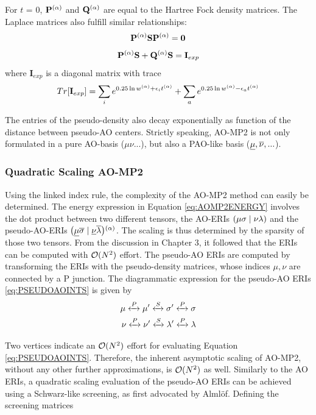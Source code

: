 \noindent For $t$ = 0, $\mathbf{P}^{(\alpha)}$ and $\mathbf{Q}^{(\alpha)}$ are equal to the Hartree Fock density matrices. The Laplace matrices also fulfill similar relationships:
\begin{equation}
\mathbf{P}^{(\alpha)} \mathbf{S} \mathbf{P}^{(\alpha)} = \mathbf{0}
\label{eq:PSP0}
\end{equation}
\begin{equation}
\mathbf{P}^{(\alpha)} \mathbf{S} + \mathbf{Q}^{(\alpha)} \mathbf{S} = \mathbf{I}_{exp}
\end{equation}
\noindent where $\mathbf{I}_{exp}$ is a diagonal matrix with trace
\begin{equation}
Tr[\mathbf{I}_{exp}] = \sum_i e^{0.25 \ln w^{(\alpha)} + \epsilon_i t^{(\alpha)}} + \sum_a e^{0.25 \ln w^{(\alpha)} - \epsilon_a t^{(\alpha)}}
\end{equation}

\noindent The entries of the pseudo-density also decay exponentially as function of the distance between pseudo-AO centers. Strictly speaking, AO-MP2 is not only formulated in a pure AO-basis ($\mu\nu...$), but also a PAO-like basis ($\underline{\mu},\overline{\nu},...$). 

\subsubsection{Quadratic Scaling AO-MP2}

Using the linked index rule, the complexity of the AO-MP2 method can easily be determined. The energy expression in Equation \ref{eq:AOMP2ENERGY} involves the dot product between two different tensors, the AO-ERIs $\left( \mu\sigma \mid \nu\lambda \right)$ and the pseudo-AO-ERIs $\smash{\left( \underline{\mu}\overline{\sigma} \mid \underline{\nu}\overline{\lambda} \right)}^{(\alpha)}$. The scaling is thus determined by the sparsity of those two tensors. From the discussion in Chapter 3, it followed that the ERIs can be computed with $\mathcal{O}(N^{2})$ effort. The pseudo-AO ERIs are computed by transforming the ERIs with the pseudo-density matrices, whose indices $\mu,\nu$ are connected by a P junction. The diagrammatic expression for the pseudo-AO ERIs \ref{eq:PSEUDOAOINTS} is given by
\begin{equation}
\begin{split}
\mu \xleftrightarrow{P} \mu' \xleftrightarrow{S} \sigma' \xleftrightarrow{P} \sigma \\
\nu \xleftrightarrow{P} \nu' \xleftrightarrow{S} \lambda' \xleftrightarrow{P} \lambda
\end{split}
\end{equation}

\noindent Two vertices indicate an $\mathcal{O}(N^{2})$ effort for evaluating Equation \ref{eq:PSEUDOAOINTS}. Therefore, the inherent asymptotic scaling of AO-MP2, without any other further approximations, is $\mathcal{O}(N^{2})$ as well. Similarly to the AO ERIs, a quadratic scaling evaluation of the pseudo-AO ERIs can be achieved using a Schwarz-like screening, as first advocated by Almlöf. Defining the screening matrices

